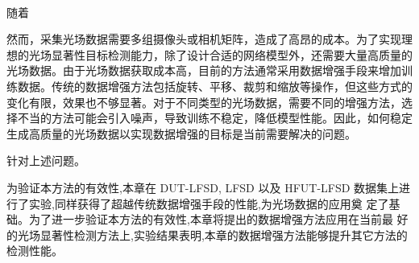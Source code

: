 ~

随着



然而，采集光场数据需要多组摄像头或相机矩阵，造成了高昂的成本。为了实现理想的光场显著性目标检测能力，除了设计合适的网络模型外，还需要大量高质量的光场数据。由于光场数据获取成本高，目前的方法通常采用数据增强手段来增加训练数据。传统的数据增强方法包括旋转、平移、裁剪和缩放等操作，但这些方式的变化有限，效果也不够显著。对于不同类型的光场数据，需要不同的增强方法，选择不当的方法可能会引入噪声，导致训练不稳定，降低模型性能。因此，如何稳定生成高质量的光场数据以实现数据增强的目标是当前需要解决的问题。



针对上述问题。  
  
为验证本方法的有效性,本章在 DUT-LFSD, LFSD 以及 HFUT-LFSD
数据集上进行了实验,同样获得了超越传统数据增强手段的性能,为光场数据的应用奠
定了基础。为了进一步验证本方法的有效性,本章将提出的数据增强方法应用在当前最
好的光场显著性检测方法上,实验结果表明,本章的数据增强方法能够提升其它方法的
检测性能。










%
%
%
%









